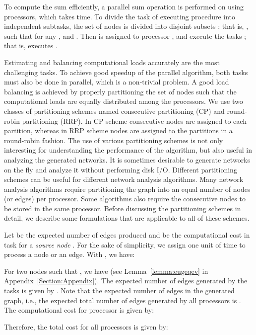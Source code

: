 \documentclass[conference,letterpaper,10pt]{IEEEtran}
\begin{document}
To compute the sum  efficiently, a parallel sum operation is performed on   using  processors, which takes  time. To divide the task of executing procedure  into independent subtasks, the set of nodes  is divided into  disjoint subsets ; that is, , such that for any ,  and . Then  is assigned to processor , and  execute the tasks ; that is,  executes . 

Estimating and balancing computational loads accurately are the most challenging tasks. To achieve good speedup of the parallel algorithm, both tasks must also be done in parallel, which is a non-trivial problem. A good load balancing is achieved by properly partitioning the set of nodes  such that the computational loads are equally distributed among the processors. We use two classes of partitioning schemes named consecutive partitioning (CP) and round-robin partitioning (RRP). In CP scheme consecutive nodes are assigned to each partition, whereas in RRP scheme nodes are assigned to the partitions in a round-robin fashion. 
The use of various partitioning schemes is not only interesting for understanding the performance of the algorithm, but also useful in analyzing the generated networks. It is sometimes desirable to generate networks on the fly and analyze it without performing disk I/O. Different partitioning schemes can be useful for different network analysis algorithms. 
Many network analysis algorithms require partitioning the graph into an equal number of nodes (or edges) per processor. Some algorithms also require the consecutive nodes to be stored in the same processor.
Before discussing the partitioning schemes in detail, we describe some formulations that are applicable to all of these schemes.

Let  be the expected number of edges produced and  be the computational cost in task  for a \textit{source node} . For the sake of simplicity, we assign one unit of  time to process a node or an edge. With , we have:


For two nodes  such that , we have  (see Lemma~\ref{lemma:eugeqev} in Appendix~\ref{Section:Appendix}). The expected number of edges generated by the tasks  is given by . Note that the expected number of edges in the generated graph, i.e., the expected total number of edges generated by all processors is .
The computational cost for processor  is given by:

Therefore, the total cost for all processors is given by:
\end{document}
